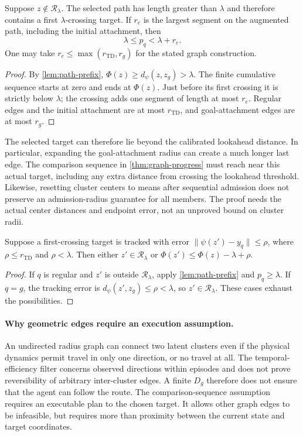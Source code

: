 \documentclass{article} %
\newcommand{\Htd}{r_{\mathrm{TD}}}
\newcommand{\dd}{d_{\psi}}
\newcommand{\Rset}{\mathcal R_\lambda}
\theoremstyle{definition}
\theoremstyle{remark}
\begin{document}
\begin{lemma}
\label{lem:overshoot}
Suppose $z\notin\Rset$. The selected path has length greater than $\lambda$ and
therefore contains a first $\lambda$-crossing target. If $r_e$ is the largest segment
on the augmented path, including the initial attachment, then
\[
 \lambda\le p_q<\lambda+r_e .
\]
One may take $r_e\le\max(\Htd,r_g)$ for the stated graph construction.
\end{lemma}
\begin{proof}
By \cref{lem:path-prefix}, $\Phi(z)\ge\dd(z,z_g)>\lambda$.
The finite cumulative sequence starts at zero and ends at $\Phi(z)$.
Just before its first crossing it is strictly below $\lambda$; the crossing adds
one segment of length at most $r_e$. Regular edges and the initial attachment are at
most $\Htd$, and goal-attachment edges are at most $r_g$.
\end{proof}
The selected target can therefore lie beyond the calibrated lookahead distance.
In particular, expanding the goal-attachment radius can create a much longer last edge.
The comparison sequence in \cref{thm:graph-progress} must reach near this actual target,
including any extra distance from crossing the lookahead threshold.
Likewise, resetting cluster centers to means after sequential admission does not
preserve an admission-radius guarantee for all members. The proof needs the actual
center distances and endpoint error, not an unproved bound on cluster radii.

\begin{lemma}
\label{lem:tracking-descent}
Suppose a first-crossing target is tracked with error
$\|\psi(z')-y_q\|\le\rho$, where $\rho\le\Htd$ and $\rho<\lambda$.
Then either $z'\in\Rset$ or
$\Phi(z')\le\Phi(z)-\lambda+\rho$.
\end{lemma}
\begin{proof}
If $q$ is regular and $z'$ is outside $\Rset$, apply \cref{lem:path-prefix} and
$p_q\ge\lambda$. If $q=g$, the tracking error is
$\dd(z',z_g)\le\rho<\lambda$, so $z'\in\Rset$. These cases exhaust the possibilities.
\end{proof}

\paragraph{Why geometric edges require an execution assumption.}
An undirected radius graph can connect two latent clusters even if the physical
dynamics permit travel in only one direction, or no travel at all.
The temporal-efficiency filter concerns observed directions within episodes and does
not prove reversibility of arbitrary inter-cluster edges.
A finite $D_g$ therefore does not ensure that the agent can follow the route.
The comparison-sequence assumption requires an executable plan to the chosen target.
It allows other graph edges to be infeasible, but requires more than proximity between
the current state and target coordinates.
\end{document}
